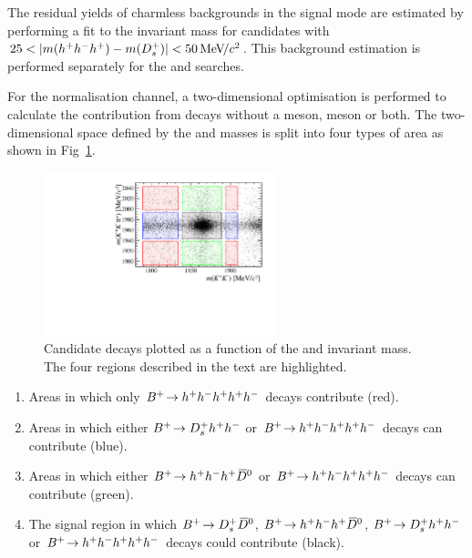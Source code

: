 The residual yields of charmless backgrounds in the signal mode are estimated by performing a fit to the \Bp invariant mass for candidates with $25 < |m(h^{+}h^{-}h^{+}) - m({{D}^+_{s}})| < 50{\mathrm{\,Me\kern -0.1em V\!/}c^2} $. This background estimation is performed separately for the \decay{\Bp}{\Dsp\phiz} and \decay{\Bp}{\Dsp\Kp\Km} searches. 

For the \decay{\Bp}{\Dsp\Dzb} normalisation channel, a two-dimensional optimisation is performed to calculate the contribution from decays without a \Dsp meson, \Dzb meson or both. 
The two-dimensional space defined by the \Dsp and \Dzb masses is split into four types of area as shown in Fig~\ref{fig:2d_normalisation}.

\begin{figure}[!h]
    \centering
        \includegraphics[width=0.6\textwidth]{figs/Selection/B2DsD0_2D_mass_Ds2KKPiRun2.pdf}
        \caption{Candidate \decay{\Bp}{\Dsp\Dzb} decays plotted as a function of the \Dsp and \Dzb invariant mass. The four regions described in the text are highlighted.}
    \label{fig:2d_normalisation}   
\end{figure}

\begin{enumerate}
\item Areas in which only ${{{B}^+}}\!\rightarrow h^{+}h^{-}h^{+}h^{+}h^{-}$ decays contribute (red).
\item Areas in which either ${{{B}^+}}\!\rightarrow D_{s}^{+}h^{+}h^{-}$  or ${{{B}^+}}\!\rightarrow h^{+}h^{-}h^{+} h^{+}h^{-}$ decays can contribute (blue). 

\item Areas in which either ${{{B}^+}}\!\rightarrow h^{+}h^{-}h^{+}{{\kern 0.2em\overline{\kern -0.2em D}{}}{}^0}$ or ${{{B}^+}}\!\rightarrow h^{+}h^{-}h^{+} h^{+}h^{-}$ decays can contribute (green). 
\item The signal region in which ${{{B}^+}}\!\rightarrow D_{s}^{+} {{\kern 0.2em\overline{\kern -0.2em D}{}}{}^0}$, ${{{B}^+}}\!\rightarrow h^{+}h^{-}h^{+}{{\kern 0.2em\overline{\kern -0.2em D}{}}{}^0}$, ${{{B}^+}}\!\rightarrow D_{s}^{+}h^{+}h^{-}$ or ${{{B}^+}}\!\rightarrow h^{+}h^{-}h^{+}h^{+}h^{-}$ decays could contribute (black).
\end{enumerate}   

